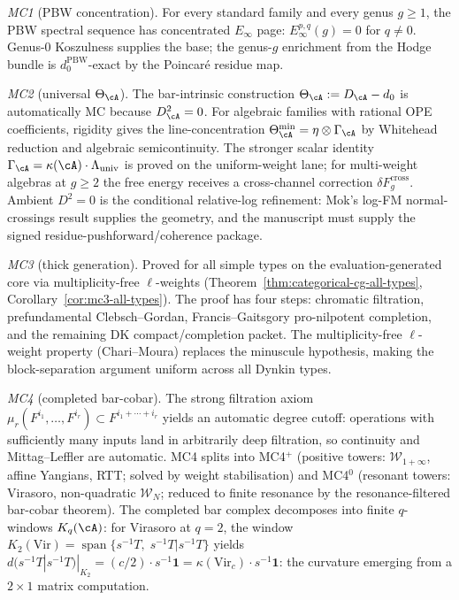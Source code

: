 \medskip

\noindent\emph{MC1} (PBW concentration).
For every standard family and every genus $g\ge 1$, the PBW spectral
sequence has concentrated $E_\infty$ page: $E_\infty^{p,q}(g)=0$ for
$q\neq 0$. Genus-$0$ Koszulness supplies the base; the genus-$g$
enrichment from the Hodge bundle is $d_0^{\mathrm{PBW}}$-exact by the
Poincar\'e residue map.

\noindent\emph{MC2} (universal $\Theta_\cA$).
The bar-intrinsic construction $\Theta_\cA:=D_\cA-d_0$ is automatically
MC because $D_\cA^2=0$. For algebraic families with rational OPE
coefficients, rigidity gives the line-concentration
$\Theta_\cA^{\min}=\eta\otimes\Gamma_\cA$ by Whitehead reduction and
algebraic semicontinuity. The stronger scalar identity
$\Gamma_\cA=\kappa(\cA)\cdot\Lambda_{\mathrm{univ}}$ is proved on the
uniform-weight lane; for multi-weight algebras at $g\ge 2$ the free
energy receives a cross-channel correction $\delta F_g^{\mathrm{cross}}$.
Ambient $D^2=0$ is the conditional relative-log refinement: Mok's
log-FM normal-crossings result supplies the geometry, and the
manuscript must supply the signed residue-pushforward/coherence
package.

\noindent\emph{MC3} (thick generation).
Proved for all simple types on the evaluation-generated core via
multiplicity-free $\ell$-weights
(Theorem~\ref{thm:categorical-cg-all-types},
Corollary~\ref{cor:mc3-all-types}). The proof has four steps: chromatic
filtration, prefundamental Clebsch--Gordan, Francis--Gaitsgory
pro-nilpotent completion, and the remaining DK compact/completion packet.
The multiplicity-free $\ell$-weight property (Chari--Moura) replaces the
minuscule hypothesis, making the block-separation argument uniform across
all Dynkin types.

\noindent\emph{MC4} (completed bar-cobar).
The strong filtration axiom
$\mu_r(F^{i_1},\ldots,F^{i_r})\subset F^{i_1+\cdots+i_r}$ yields an
automatic degree cutoff: operations with sufficiently many inputs land in
arbitrarily deep filtration, so continuity and Mittag--Leffler are
automatic. MC4 splits into MC4${}^+$ (positive towers:
$\mathcal W_{1+\infty}$, affine Yangians, RTT; solved by weight
stabilisation) and MC4${}^0$ (resonant towers: Virasoro, non-quadratic
$\mathcal W_N$; reduced to finite resonance by the resonance-filtered
bar-cobar theorem). The completed bar complex decomposes into finite
$q$-windows $K_q(\cA)$: for Virasoro at $q=2$, the window
$K_2(\mathrm{Vir})=\operatorname{span}\{s^{-1}T,\;s^{-1}T|s^{-1}T\}$ yields
$d(s^{-1}T|s^{-1}T)|_{K_2}=(c/2)\cdot s^{-1}\mathbf{1}=\kappa(\mathrm{Vir}_c)
\cdot s^{-1}\mathbf{1}$: the curvature emerging from a
$2\times 1$ matrix computation.

